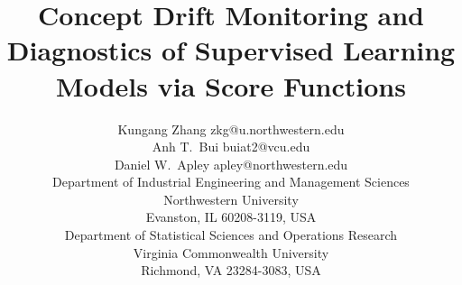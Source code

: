 \documentclass[twoside,11pt]{article}
\begin{document}
\title{Concept Drift Monitoring and Diagnostics of Supervised Learning Models via Score Functions}

\author{\name Kungang Zhang \email zkg@u.northwestern.edu \\
	\name Anh T.\ Bui \email buiat2@vcu.edu \\
	\name Daniel W.\ Apley \email apley@northwestern.edu \\
       \addr Department of Industrial Engineering and Management Sciences\\
       Northwestern University\\
       Evanston, IL 60208-3119, USA\\
       Department of Statistical Sciences and Operations Research\\ 
       Virginia Commonwealth University\\
       Richmond, VA 23284-3083, USA}

\maketitle

\end{document}
